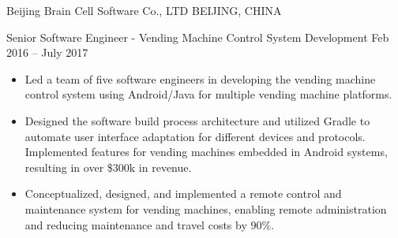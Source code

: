 \documentclass[10pt,a4paper]{article}
\begin{document}
\headedsection
{Beijing Brain Cell Software Co., LTD}
{\textsc{BEIJING, CHINA}}
  {
    \headedsubsection
    {Senior Software Engineer - Vending Machine Control System Development}
    {Feb 2016 -- July 2017}
    {\vspace{0.1em}
      \begin{itemize}
        \setlength{\itemsep}{0.3em}
        \item Led a team of five software engineers in developing the vending machine control system using Android/Java for multiple vending machine platforms.
        \item Designed the software build process architecture and utilized Gradle to automate user interface adaptation for different devices and protocols. Implemented features for vending machines embedded in Android systems, resulting in over \$300k in revenue.
        \item Conceptualized, designed, and implemented a remote control and maintenance system for vending machines, enabling remote administration and reducing maintenance and travel costs by 90\%.







\end{itemize}}}
\end{document}
